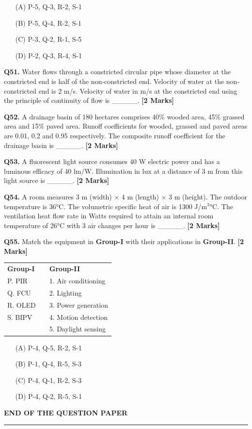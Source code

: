 \documentclass[11pt]{article}
\newcommand{\questionb}[2]{
    \noindent\textbf{Q#2.} #1 \hfill \textbf{[2 Marks]}
}
\begin{document}
\begin{enumerate}
    \item[(A)] P-5, Q-3, R-2, S-1
    \item[(B)] P-5, Q-4, R-2, S-1  
    \item[(C)] P-3, Q-2, R-1, S-5
    \item[(D)] P-2, Q-3, R-4, S-1
\end{enumerate}

\vspace{0.5cm}

\questionb{Water flows through a constricted circular pipe whose diameter at the constricted end is half of the non-constricted end. Velocity of water at the non-constricted end is 2 m/s. Velocity of water in m/s at the constricted end using the principle of continuity of flow is \_\_\_\_\_.}{51}

\vspace{0.5cm}

\questionb{A drainage basin of 180 hectares comprises 40\% wooded area, 45\% grassed area and 15\% paved area. Runoff coefficients for wooded, grassed and paved areas are 0.01, 0.2 and 0.95 respectively. The composite runoff coefficient for the drainage basin is \_\_\_\_\_.}{52}

\vspace{0.5cm}

\questionb{A fluorescent light source consumes 40 W electric power and has a luminous efficacy of 40 lm/W. Illumination in lux at a distance of 3 m from this light source is \_\_\_\_\_.}{53}

\vspace{0.5cm}

\questionb{A room measures 3 m (width) × 4 m (length) × 3 m (height). The outdoor temperature is 36°C. The volumetric specific heat of air is 1300 J/m$^3$°C. The ventilation heat flow rate in Watts required to attain an internal room temperature of 26°C with 3 air changes per hour is \_\_\_\_\_.}{54}

\vspace{0.5cm}

\questionb{Match the equipment in \textbf{Group-I} with their applications in \textbf{Group-II}.}{55}

\begin{tabularx}{\linewidth}{lXl}
\textbf{Group-I} & & \textbf{Group-II} \\
P. PIR & & 1. Air conditioning \\
Q. FCU & & 2. Lighting \\
R. OLED & & 3. Power generation \\
S. BIPV & & 4. Motion detection \\
& & 5. Daylight sensing \\
\end{tabularx}

\begin{enumerate}
    \item[(A)] P-4, Q-5, R-2, S-1
    \item[(B)] P-1, Q-4, R-5, S-3  
    \item[(C)] P-4, Q-1, R-2, S-3
    \item[(D)] P-4, Q-2, R-5, S-1
\end{enumerate}

\vspace{0.5cm}

\vspace{5cm}
\begin{center}
\textbf{END OF THE QUESTION PAPER}
\rule{\textwidth}{0.5pt} 
\end{center}
\end{document}
